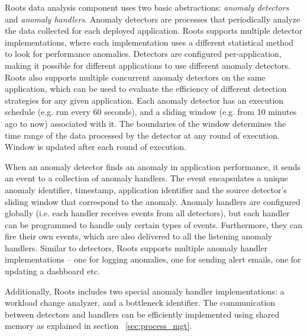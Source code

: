Roots data analysis component uses two basic abstractions: \textit{anomaly detectors} 
and \textit{anomaly handlers}.
Anomaly detectors are processes that periodically analyze the data collected for
each deployed application. Roots supports multiple detector implementations, where each implementation
uses a different statistical method to look for performance anomalies. Detectors are configured
per-application, making it possible for different applications to use different anomaly 
detectors. Roots also supports multiple concurrent anomaly detectors on the same application, which can be used
to evaluate the efficiency of different detection strategies for any given application. Each
anomaly detector has an execution schedule (e.g. run every 60 seconds), and a sliding window 
(e.g. from 10 minutes ago to now)
associated with it. The boundaries of the window determines the time range
of the data processed by the detector at any round of execution. Window is updated 
after each round of execution. 

When an anomaly detector finds an anomaly in application performance, it sends an event
to a collection of anomaly handlers. The event encapsulates a unique anomaly identifier, 
timestamp, application identifier and the source detector's sliding window that correspond to the
anomaly. Anomaly handlers are configured globally (i.e. each handler
receives events from all detectors), but each handler can be programmed to handle only
certain types of events. Furthermore, they can fire their own events, which are also delivered to
all the listening anomaly handlers. Similar to detectors, Roots supports multiple anomaly handler
implementations -- one for logging anomalies, one for sending alert emails, one
for updating a dashboard etc. 

Additionally, Roots includes two special anomaly handler
implementations: a workload change analyzer, and a bottleneck identifier.
The communication between detectors and handlers can be efficiently implemented
using shared memory as explained in section ~\ref{sec:process_mgt}.


